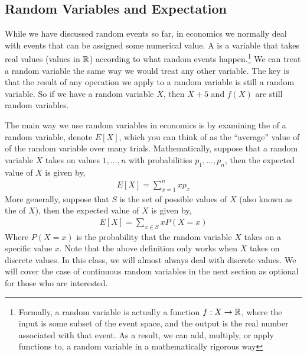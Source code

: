 \subsection*{Random Variables and Expectation}
While we have discussed random events so far, in economics we normally deal with events that can be assigned some numerical value. A  is a variable that takes real values (values in $\mathbb{R}$) according to what random events happen.\footnote{
    Formally, a random variable is actually a function $f: X \to \mathbb{R}$, where the input is some subset of the event space, and the output is the real number associated with that event. As a result, we can add, multiply, or apply functions to, a random variable in a mathematically rigorous way
} We can treat a random variable the same way we would treat any other variable. The key is that the result of any operation we apply to a random variable is still a random variable. So if we have a random variable $X$, then $X + 5$ and $f(X)$ are still random variables. 

The main way we use random variables in economics is by examining the  of a random variable, denote $E[X]$, which you can think of as the ``average'' value of of the random variable over many trials. Mathematically, suppose that a random variable $X$ takes on values $1, \dots, n$ with probabilities $p_1, \dots, p_n$, then the expected value of $X$ is given by,
\begin{align*}
    E[X] = \sum_{x = 1}^n x p_x
\end{align*}
More generally, suppose that $S$ is the set of possible values of $X$ (also known as the  of $X$), then the expected value of $X$ is given by,
\begin{align*}
    E[X] = \sum_{x \in S} x P(X = x)
\end{align*}
Where $P(X = x)$ is the probability that the random variable $X$ takes on a specific value $x$. Note that the above definition only works when $X$ takes on discrete values. In this class, we will almost always deal with discrete values. We will cover the case of continuous random variables in the next section as optional for those who are interested.  

